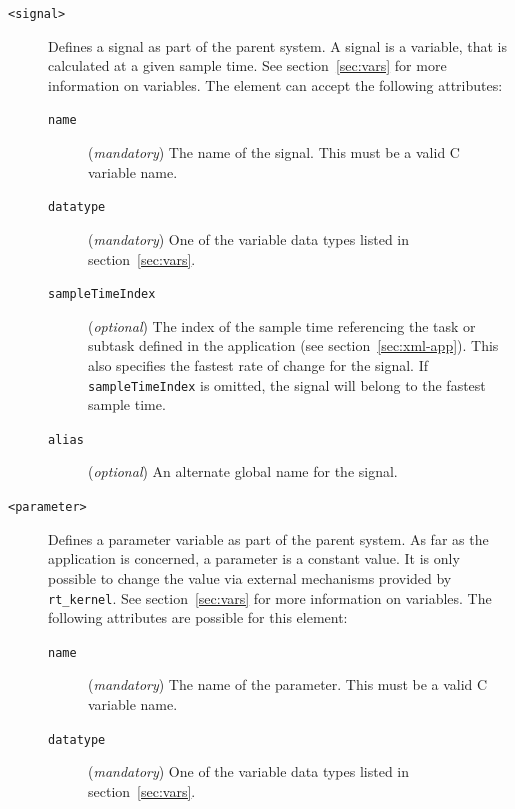 \begin{description}

\item[\small\texttt{<signal>}] Defines a signal as part of the parent system.
A signal is a variable, that is calculated at a given sample time. See
section~\ref{sec:vars} for more information on variables. The element can
accept the following attributes:

\begin{description}

\item[\small\texttt{name}] (\textit{mandatory}) The name of the signal. This
must be a valid C variable name.

\item[\small\texttt{datatype}] (\textit{mandatory}) One of the variable data
types listed in section~\ref{sec:vars}.

\item[\small\texttt{sampleTimeIndex}] (\textit{optional}) The index of the
sample time referencing the task or subtask defined in the application (see
section~\ref{sec:xml-app}). This also specifies the fastest rate of change for
the signal. If \texttt{sampleTimeIndex} is omitted, the signal will belong to
the fastest sample time.

\item[\small\texttt{alias}] (\textit{optional}) An alternate global name for
the signal.

\end{description}

\item[\small\texttt{<parameter>}] Defines a parameter variable as part of the
parent system. As far as the application is concerned, a parameter is a
constant value. It is only possible to change the value via external
mechanisms provided by \texttt{rt\_kernel}. See section~\ref{sec:vars} for
more information on variables. The following attributes are possible for this
element:

\begin{description}

\item[\small\texttt{name}] (\textit{mandatory}) The name of the parameter.
This must be a valid C variable name.

\item[\small\texttt{datatype}] (\textit{mandatory}) One of the variable data
types listed in section~\ref{sec:vars}.

\end{description}


\end{description}
